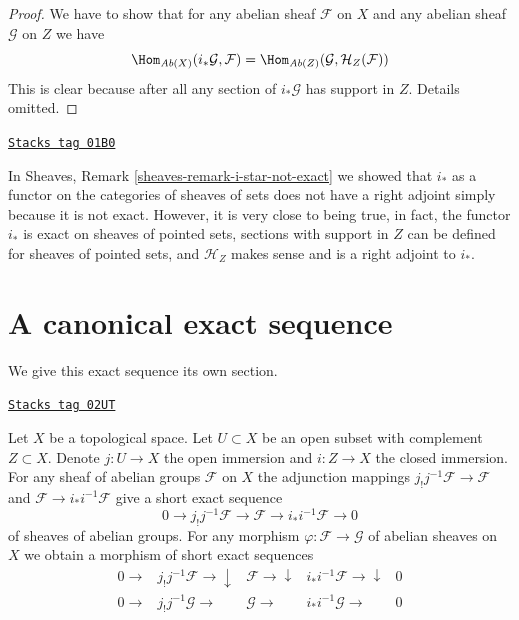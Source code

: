 \begin{proof}
We have to show that for any abelian sheaf $\mathcal{F}$ on $X$ and any
abelian sheaf $\mathcal{G}$ on $Z$ we have
$$
\Hom_{\textit{Ab}(X)}(i_*\mathcal{G}, \mathcal{F}) =
\Hom_{\textit{Ab}(Z)}(\mathcal{G}, \mathcal{H}_Z(\mathcal{F}))
$$
This is clear because after all any section of $i_*\mathcal{G}$
has support in $Z$. Details omitted.
\end{proof}

\begin{remark}
\label{modules-remark-i-star-right-adjoint}
\href{https://stacks.math.columbia.edu/tag/01B0}{\texttt{Stacks tag 01B0}}

In Sheaves, Remark \ref{sheaves-remark-i-star-not-exact}
we showed that $i_*$ as a functor
on the categories of sheaves of sets
does not have a right adjoint simply because
it is not exact. However, it is very close to being
true, in fact, the functor $i_*$ is exact on sheaves
of pointed sets, sections with support in $Z$ can
be defined for sheaves of pointed sets, and $\mathcal{H}_Z$
makes sense and is a right adjoint to $i_*$.
\end{remark}

\section{A canonical exact sequence}
\label{modules-section-canonical-exact-sequence}
We give this exact sequence its own section.

\begin{lemma}
\label{modules-lemma-canonical-exact-sequence}
\href{https://stacks.math.columbia.edu/tag/02UT}{\texttt{Stacks tag 02UT}}

Let $X$ be a topological space.
Let $U \subset X$ be an open subset with complement $Z \subset X$.
Denote $j : U \to X$ the open immersion and
$i : Z \to X$ the closed immersion.
For any sheaf of abelian groups $\mathcal{F}$ on $X$
the adjunction mappings $j_{!}j^{-1}\mathcal{F} \to \mathcal{F}$ and
$\mathcal{F} \to i_*i^{-1}\mathcal{F}$ give a short exact
sequence
$$
0 \to j_{!}j^{-1}\mathcal{F} \to \mathcal{F} \to i_*i^{-1}\mathcal{F} \to 0
$$
of sheaves of abelian groups. For any morphism
$\varphi : \mathcal{F} \to \mathcal{G}$ of abelian sheaves on $X$
we obtain a morphism of short exact sequences
$$
\begin{array}{ccccc}0 \longrightarrow & j_{!}j^{-1}\mathcal{F} \longrightarrow\downarrow & \mathcal{F} \longrightarrow\downarrow & i_*i^{-1}\mathcal{F} \longrightarrow\downarrow & 0 \\ 0 \longrightarrow & j_{!}j^{-1}\mathcal{G} \longrightarrow & \mathcal{G} \longrightarrow & i_*i^{-1}\mathcal{G} \longrightarrow & 0\end{array}
$$
\end{lemma}

